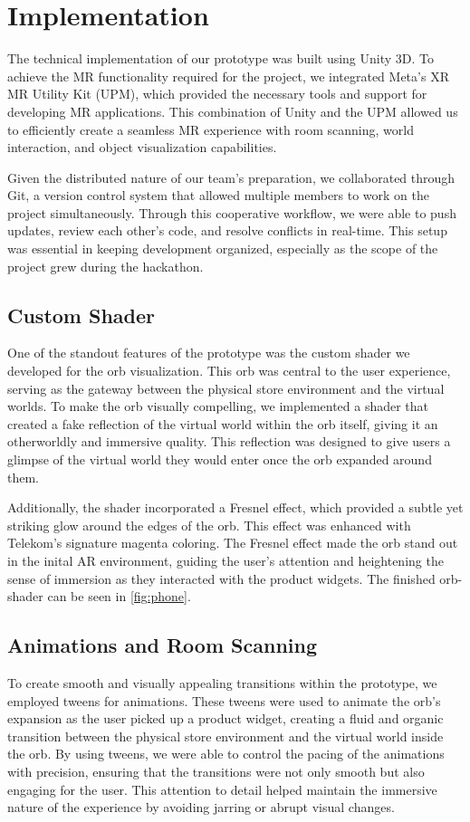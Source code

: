 \documentclass[12pt]{article}
\begin{document}
\section{Implementation}
\label{sec:implementation}
The technical implementation of our prototype was built using Unity 3D. To achieve the MR functionality required for the project, we integrated Meta's XR MR Utility Kit (UPM), which provided the necessary tools and support for developing MR applications. This combination of Unity and the UPM allowed us to efficiently create a seamless MR experience with room scanning, world interaction, and object visualization capabilities.

Given the distributed nature of our team’s preparation, we collaborated through Git, a version control system that allowed multiple members to work on the project simultaneously. Through this cooperative workflow, we were able to push updates, review each other's code, and resolve conflicts in real-time. This setup was essential in keeping development organized, especially as the scope of the project grew during the hackathon.

\subsection{Custom Shader}
One of the standout features of the prototype was the custom shader we developed for the orb visualization. This orb was central to the user experience, serving as the gateway between the physical store environment and the virtual worlds. To make the orb visually compelling, we implemented a shader that created a fake reflection of the virtual world within the orb itself, giving it an otherworldly and immersive quality. This reflection was designed to give users a glimpse of the virtual world they would enter once the orb expanded around them.

Additionally, the shader incorporated a Fresnel effect, which provided a subtle yet striking glow around the edges of the orb. This effect was enhanced with Telekom’s signature magenta coloring. The Fresnel effect made the orb stand out in the inital AR environment, guiding the user’s attention and heightening the sense of immersion as they interacted with the product widgets. The finished orb-shader can be seen in \autoref{fig:phone}.

\subsection{Animations and Room Scanning}
To create smooth and visually appealing transitions within the prototype, we employed tweens for animations. These tweens were used to animate the orb’s expansion as the user picked up a product widget, creating a fluid and organic transition between the physical store environment and the virtual world inside the orb. By using tweens, we were able to control the pacing of the animations with precision, ensuring that the transitions were not only smooth but also engaging for the user. This attention to detail helped maintain the immersive nature of the experience by avoiding jarring or abrupt visual changes.
\end{document}
